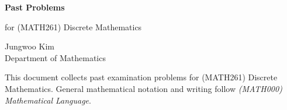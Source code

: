 \documentclass[11pt,oneside]{article}
\begin{document}
\thispagestyle{empty}

\begin{center}
    \vspace*{1.1cm}

    {\LARGE\bfseries Past Problems\par}

    \vspace{0.25cm}

    {\large for (MATH261) Discrete Mathematics\par}

    \vspace{0.75cm}

    {\normalsize
    Jungwoo Kim\\
    Department of Mathematics\\
    \PohangUniversityOfScienceAndTechnology
    \par}
\end{center}

\vspace{0.45cm}

This document collects past examination problems for (MATH261) Discrete Mathematics. General mathematical notation and writing follow \textit{(MATH000) Mathematical Language}.
\end{document}
